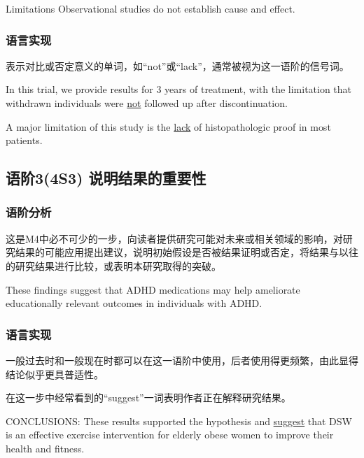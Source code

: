 \documentclass[a4paper]{ctexbook}
\begin{document}
    \begin{eg}{}
      Limitations Observational studies do not establish cause and effect.
    \end{eg}

    \subsubsection{语言实现}

    表示对比或否定意义的单词，如“not”或“lack”，通常被视为这一语阶的信号词。

    \begin{eg}{}
      In this trial, we provide results for 3 years of treatment, with the limitation that withdrawn individuals were \uline{not} followed up after discontinuation.   
    \end{eg}

    \begin{eg}{}
      A major limitation of this study is the \uline{lack} of histopathologic proof in most patients.     
    \end{eg}

  \subsection{语阶3(4S3) 说明结果的重要性}
    \subsubsection{语阶分析}

    这是M4中必不可少的一步，向读者提供研究可能对未来或相关领域的影响，对研究结果的可能应用提出建议，说明初始假设是否被结果证明或否定，将结果与以往的研究结果进行比较，或表明本研究取得的突破。

    \begin{eg}{}
      These findings suggest that ADHD medications may help ameliorate educationally relevant outcomes in individuals with ADHD.
    \end{eg}

    \subsubsection{语言实现}

    一般过去时和一般现在时都可以在这一语阶中使用，后者使用得更频繁，由此显得结论似乎更具普适性。

    在这一步中经常看到的“suggest”一词表明作者正在解释研究结果。


    \begin{eg}{}
      CONCLUSIONS: These results supported the hypothesis and \uline{suggest} that DSW is an effective exercise intervention for elderly obese women to improve their health and fitness.
    \end{eg}
    
\end{document}
